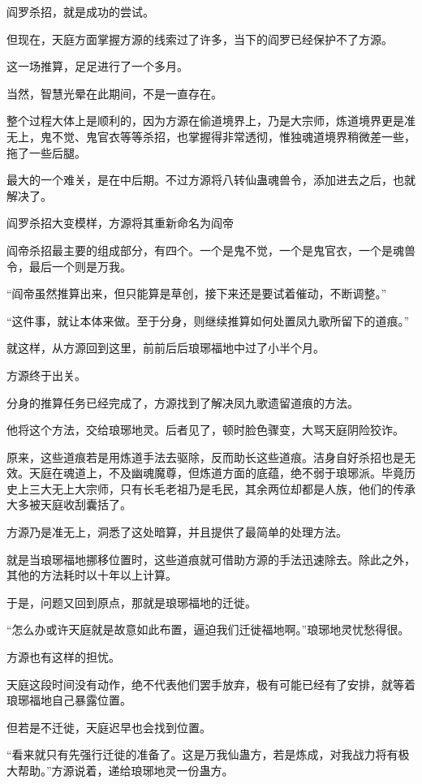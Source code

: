 \begin{this_body}
阎罗杀招，就是成功的尝试。

但现在，天庭方面掌握方源的线索过了许多，当下的阎罗已经保护不了方源。

这一场推算，足足进行了一个多月。

当然，智慧光晕在此期间，不是一直存在。

整个过程大体上是顺利的，因为方源在偷道境界上，乃是大宗师，炼道境界更是准无上，鬼不觉、鬼官衣等等杀招，也掌握得非常透彻，惟独魂道境界稍微差一些，拖了一些后腿。

最大的一个难关，是在中后期。不过方源将八转仙蛊魂兽令，添加进去之后，也就解决了。

阎罗杀招大变模样，方源将其重新命名为阎帝

阎帝杀招最主要的组成部分，有四个。一个是鬼不觉，一个是鬼官衣，一个是魂兽令，最后一个则是万我。

“阎帝虽然推算出来，但只能算是草创，接下来还是要试着催动，不断调整。”

“这件事，就让本体来做。至于分身，则继续推算如何处置凤九歌所留下的道痕。”

就这样，从方源回到这里，前前后后琅琊福地中过了小半个月。

方源终于出关。

分身的推算任务已经完成了，方源找到了解决凤九歌遗留道痕的方法。

他将这个方法，交给琅琊地灵。后者见了，顿时脸色骤变，大骂天庭阴险狡诈。

原来，这些道痕若是用炼道手法去驱除，反而助长这些道痕。洁身自好杀招也是无效。天庭在魂道上，不及幽魂魔尊，但炼道方面的底蕴，绝不弱于琅琊派。毕竟历史上三大无上大宗师，只有长毛老祖乃是毛民，其余两位却都是人族，他们的传承大多被天庭收刮囊括了。

方源乃是准无上，洞悉了这处暗算，并且提供了最简单的处理方法。

就是当琅琊福地挪移位置时，这些道痕就可借助方源的手法迅速除去。除此之外，其他的方法耗时以十年以上计算。

于是，问题又回到原点，那就是琅琊福地的迁徙。

“怎么办或许天庭就是故意如此布置，逼迫我们迁徙福地啊。”琅琊地灵忧愁得很。

方源也有这样的担忧。

天庭这段时间没有动作，绝不代表他们罢手放弃，极有可能已经有了安排，就等着琅琊福地自己暴露位置。

但若是不迁徙，天庭迟早也会找到位置。

“看来就只有先强行迁徙的准备了。这是万我仙蛊方，若是炼成，对我战力将有极大帮助。”方源说着，递给琅琊地灵一份蛊方。


\end{this_body}
